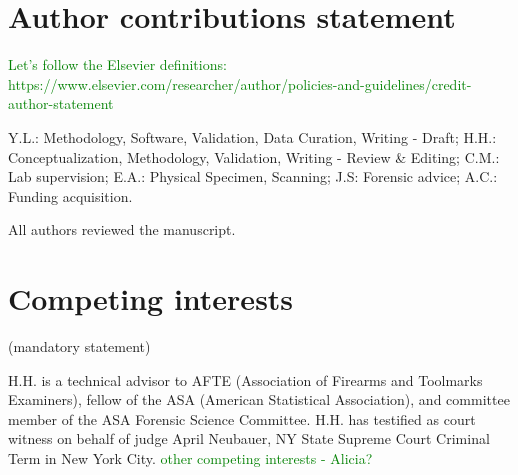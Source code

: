 \documentclass[fleqn,10pt]{wlscirep}
\newcommand{\hh}[1]{{\textcolor{Green}{#1}}}
\begin{document}
\section*{Author contributions statement}

\hh{Let's follow the Elsevier definitions: https://www.elsevier.com/researcher/author/policies-and-guidelines/credit-author-statement}

Y.L.: Methodology, Software, Validation, Data Curation, Writing - Draft;
H.H.: Conceptualization, Methodology, Validation, Writing - Review \&
Editing; C.M.: Lab supervision; E.A.: Physical Specimen, Scanning; J.S:
Forensic advice; A.C.: Funding acquisition.

\noindent
All authors reviewed the manuscript. 

\section*{Competing interests} (mandatory statement)

H.H. is a technical advisor to AFTE (Association of Firearms and
Toolmarks Examiners), fellow of the ASA (American Statistical
Association), and committee member of the ASA Forensic Science
Committee. H.H. has testified as court witness on behalf of judge April
Neubauer, NY State Supreme Court Criminal Term in New York City.
\hh{other competing interests - Alicia?}
\end{document}
